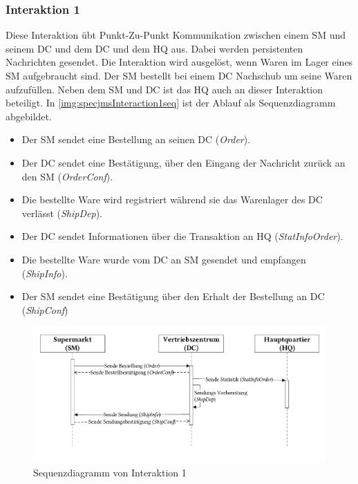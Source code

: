 \subsubsection{Interaktion 1}
\label{sec:interaction1desc}
Diese Interaktion übt Punkt-Zu-Punkt Kommunikation zwischen einem SM und seinem DC und dem DC und dem HQ aus. Dabei werden persistenten Nachrichten gesendet. Die Interaktion wird ausgelöst, wenn Waren im Lager eines SM aufgebraucht sind. Der SM bestellt bei einem DC Nachschub um seine Waren aufzufüllen. Neben dem SM und DC ist das HQ auch an dieser Interaktion beteiligt. In \autoref{img:specjmsInteraction1seq} ist der Ablauf als Sequenzdiagramm abgebildet. 
\begin{itemize}
    \item Der SM sendet eine Bestellung an seinen DC (\emph{Order}).
    \item Der DC sendet eine Bestätigung, über den Eingang der Nachricht zurück an den SM (\emph{OrderConf}).
    \item Die bestellte Ware wird registriert während sie das Warenlager des DC verlässt (\emph{ShipDep}).
    \item Der DC sendet Informationen über die Transaktion an HQ (\emph{StatInfoOrder}).
    \item Die bestellte Ware wurde vom DC an SM gesendet und empfangen (\emph{ShipInfo}).
    \item Der SM sendet eine Bestätigung über den Erhalt der Bestellung an DC (\emph{ShipConf})
\end{itemize}

\begin{figure}
\center
  \includegraphics[width=1\textwidth]{images/evaluation/specjms/evaluationInteraktion1seq.pdf}
  \caption{Sequenzdiagramm von Interaktion 1}
  \label{img:specjmsInteraction1seq}
\end{figure}

